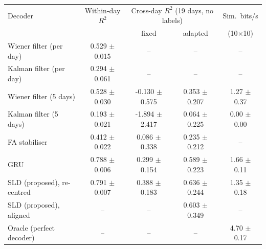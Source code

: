 \begin{tabular}{lcccc}
\toprule
Decoder & Within-day $R^2$ & \multicolumn{2}{c}{Cross-day $R^2$ (19 days, no labels)} & Sim.\ bits/s \\
 & & fixed & adapted & (10$\times$10) \\
\midrule
Wiener filter (per day) & 0.529 $\pm$ 0.015 & -- & -- & -- \\
Kalman filter (per day) & 0.294 $\pm$ 0.061 & -- & -- & -- \\
Wiener filter (5 days) & 0.528 $\pm$ 0.030 & -0.130 $\pm$ 0.575 & 0.353 $\pm$ 0.207 & 1.27 $\pm$ 0.37 \\
Kalman filter (5 days) & 0.193 $\pm$ 0.021 & -1.894 $\pm$ 2.417 & 0.064 $\pm$ 0.225 & 0.00 $\pm$ 0.00 \\
FA stabiliser~\cite{degenhart2020stabilization} & 0.412 $\pm$ 0.022 & 0.086 $\pm$ 0.338 & 0.235 $\pm$ 0.212 & -- \\
GRU & 0.788 $\pm$ 0.006 & 0.299 $\pm$ 0.154 & 0.589 $\pm$ 0.223 & 1.66 $\pm$ 0.11 \\
SLD (proposed), re-centred & 0.791 $\pm$ 0.007 & 0.388 $\pm$ 0.183 & 0.636 $\pm$ 0.244 & 1.35 $\pm$ 0.18 \\
SLD (proposed), aligned & -- & -- & 0.603 $\pm$ 0.349 & -- \\
Oracle (perfect decoder) & -- & -- & -- & 4.70 $\pm$ 0.17 \\
\bottomrule
\end{tabular}
